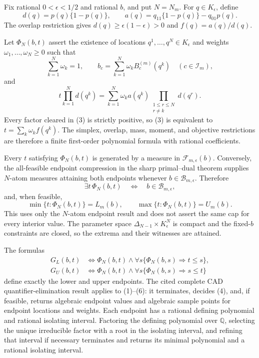 Fix rational \(0<\epsilon<1/2\) and rational \(b\), and put \(N=N_m\).  For \(q\in K_{\epsilon}\), define
\[
 d(q)=p(q)\{1-p(q)\},
 \qquad a(q)=q_{11}\{1-p(q)\}-q_{01}p(q).
\tag{1}
\]
The overlap restriction gives \(d(q)\geq\epsilon(1-\epsilon)>0\) and \(f(q)=a(q)/d(q)\).

Let \(\Phi_N(b,t)\) assert the existence of locations \(q^1,\ldots,q^N\in K_{\epsilon}\) and weights \(\omega_1,\ldots,\omega_N\geq0\) such that
\[
 \sum_{k=1}^N\omega_k=1,
 \qquad
 b_c=\sum_{k=1}^N\omega_kB_c^{(m)}(q^k)
 \quad(c\in\mathcal I_m),
\tag{2}
\]
and
\[
 t\prod_{k=1}^Nd(q^k)
 =\sum_{k=1}^N\omega_ka(q^k)
   \prod_{\substack{1\leq r\leq N\\r\neq k}}d(q^r).
\tag{3}
\]
Every factor cleared in (3) is strictly positive, so (3) is equivalent to \(t=\sum_k\omega_kf(q^k)\).  The simplex, overlap, mass, moment, and objective restrictions are therefore a finite first-order polynomial formula with rational coefficients.

Every \(t\) satisfying \(\Phi_N(b,t)\) is generated by a measure in \(\mathcal F_{m,\epsilon}(b)\).  Conversely, the all-feasible endpoint compression in the sharp primal--dual theorem supplies \(N\)-atom measures attaining both endpoints whenever \(b\in\mathcal B_{m,\epsilon}\).  Therefore
\[
 \exists t\,\Phi_N(b,t)\quad\Longleftrightarrow\quad b\in\mathcal B_{m,\epsilon},
\tag{4}
\]
and, when feasible,
\[
 \min\{t:\Phi_N(b,t)\}=L_m(b),
 \qquad
 \max\{t:\Phi_N(b,t)\}=U_m(b).
\tag{5}
\]
This uses only the \(N\)-atom endpoint result and does not assert the same cap for every interior value.  The parameter space \(\Delta_{N-1}\times K_{\epsilon}^N\) is compact and the fixed-\(b\) constraints are closed, so the extrema and their witnesses are attained.

The formulas
\[
 \begin{split}
 G_L(b,t)&\Longleftrightarrow
 \Phi_N(b,t)\wedge\forall s\{\Phi_N(b,s)\Rightarrow t\leq s\},\\
 G_U(b,t)&\Longleftrightarrow
 \Phi_N(b,t)\wedge\forall s\{\Phi_N(b,s)\Rightarrow s\leq t\}
 \end{split}
\tag{6}
\]
define exactly the lower and upper endpoints.  The cited complete CAD quantifier-elimination result applies to (1)--(6): it terminates, decides (4), and, if feasible, returns algebraic endpoint values and algebraic sample points for endpoint locations and weights.  Each endpoint has a rational defining polynomial and rational isolating interval.  Factoring the defining polynomial over \(\mathbb Q\), selecting the unique irreducible factor with a root in the isolating interval, and refining that interval if necessary terminates and returns its minimal polynomial and a rational isolating interval.


